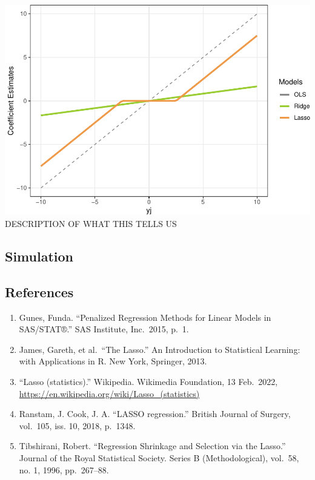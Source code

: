 \documentclass[
]{article}
\begin{document}
\includegraphics{Final-Project_files/figure-latex/unnamed-chunk-1-1.pdf}
DESCRIPTION OF WHAT THIS TELLS US

\hypertarget{simulation}{%
\subsection{Simulation}\label{simulation}}

\hypertarget{references}{%
\subsection{References}\label{references}}

\begin{enumerate}
\def\labelenumi{\arabic{enumi}.}
\item
  Gunes, Funda. ``Penalized Regression Methods for Linear Models in
  SAS/STAT®.'' SAS Institute, Inc.~2015, p.~1.
\item
  James, Gareth, et al.~``The Lasso.'' An Introduction to Statistical
  Learning: with Applications in R. New York, Springer, 2013.
\item
  ``Lasso (statistics).'' Wikipedia. Wikimedia Foundation, 13 Feb.~2022,
  \url{https://en.wikipedia.org/wiki/Lasso_(statistics)}
\item
  Ranstam, J. Cook, J. A. ``LASSO regression.'' British Journal of
  Surgery, vol.~105, iss. 10, 2018, p.~1348.
\item
  Tibshirani, Robert. ``Regression Shrinkage and Selection via the
  Lasso.'' Journal of the Royal Statistical Society. Series B
  (Methodological), vol.~58, no. 1, 1996, pp.~267--88.
\end{enumerate}
\end{document}
